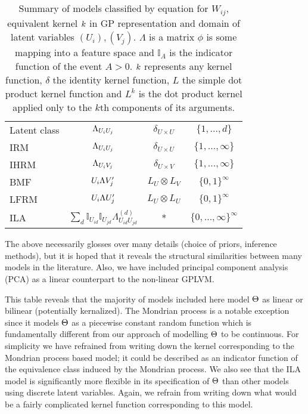 \begin{table}[h]
\begin{tabular}{l|ccc}
    \midrule
    Latent class & $\Lambda_{U_iU_j}$ & $\delta_{U\times U}$ & $\{1,\ldots,d\}$ \\%
    IRM &$\Lambda_{U_iU_j}$ & $\delta_{U\times U}$ & $\{1,\ldots,\infty\}$ \\%
    IHRM  &$\Lambda_{U_iV_j}$ & $\delta_{U\times V}$ & $\{1,\ldots,\infty\}$ \\%
    BMF  & $U_i\Lambda V_j'$ & $L_U \otimes L_V$ & $\{0,1\}^\infty$ \\%
    LFRM  & $U_i\Lambda U_j'$ & $L_U \otimes L_U$ & $\{0,1\}^\infty$ \\%
    ILA & $\sum_d \mathbb{I}_{U_{id}}\mathbb{I}_{U_{jd}}\Lambda^{(d)}_{U_{id}U_{jd}}$ & * & $\{0,\ldots,\infty\}^\infty$ \\%
\end{tabular}
\caption{
Summary of models classified by equation for $W_{ij}$, equivalent kernel $k$ in GP representation and domain of latent variables $(U_i), (V_j)$.
$\Lambda$ is a matrix $\phi$ is some mapping into a feature space and $\mathbb{I}_A$ is the indicator function of the event $A>0$.
$k$ represents any kernel function, $\delta$ the identity kernel function, $L$ the simple dot product kernel function and $L^k$ is the dot product kernel applied only to the $k$th components of its arguments.
}
\label{table:ModelComparison}
\end{table}

The above necessarily glosses over many details (\eg choice of priors, inference methods), but it is hoped that it reveals the structural similarities between many models in the literature.
Also, we have included principal component analysis (PCA) as a linear counterpart to the non-linear GPLVM.

This table reveals that the majority of models included here model $\Theta$ as linear or bilinear (potentially kernalized).
The Mondrian process \cite{Roy2009} is a notable exception since it models $\Theta$ as a piecewise constant random function which is fundamentally different from our approach of modelling $\Theta$ to be continuous.
For simplicity we have refrained from writing down the kernel corresponding to the Mondrian process based model; it could be described as an indicator function of the equivalence class induced by the Mondrian process.
We also see that the ILA model is significantly more flexible in its specification of $\Theta$ than other models using discrete latent variables.
Again, we refrain from writing down what would be a fairly complicated kernel function corresponding to this model.


